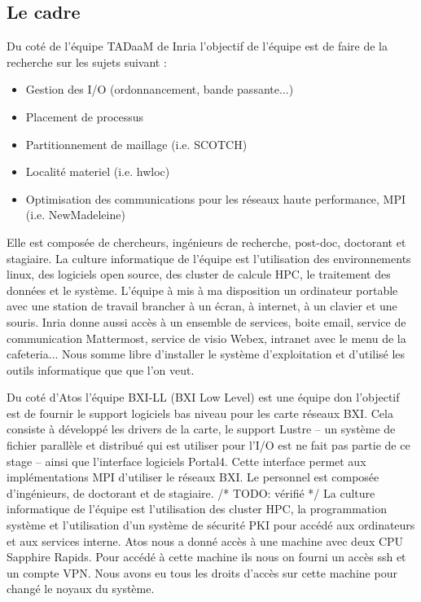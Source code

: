 \subsection{Le cadre}

Du coté de l'équipe TADaaM de Inria l'objectif de l'équipe est de faire de la recherche sur les sujets suivant :

\begin{itemize}
  \item Gestion des I/O (ordonnancement, bande passante...)
  \item Placement de processus
  \item Partitionnement de maillage (i.e. SCOTCH)
  \item Localité materiel (i.e. hwloc)
  \item Optimisation des communications pour les réseaux haute performance, MPI (i.e. NewMadeleine)
\end{itemize}

Elle est composée de chercheurs, ingénieurs de recherche, post-doc, doctorant et stagiaire.
La culture informatique de l'équipe est l'utilisation des environnements linux, des logiciels open source,
des cluster de calcule HPC, le traitement des données et le système.
L'équipe à mis à ma disposition un ordinateur portable avec une station de travail brancher à un écran, à internet, à un clavier et une souris.
Inria donne aussi accès à un ensemble de services, boite email, service de communication Mattermost, service de visio Webex, intranet avec le menu de la cafeteria...
Nous somme libre d'installer le système d'exploitation et d'utilisé les outils informatique que que l'on veut.

Du coté d'Atos l'équipe BXI-LL (BXI Low Level) est une équipe don l'objectif est de fournir le support logiciels bas niveau pour les carte réseaux BXI.
Cela consiste à développé les drivers de la carte, le support Lustre -- un système de fichier parallèle et distribué qui est utiliser pour l'I/O est ne fait pas partie de ce stage -- ainsi que l'interface logiciels Portal4.
Cette interface permet aux implémentations MPI d'utiliser le réseaux BXI.
Le personnel est composée d'ingénieurs, de doctorant et de stagiaire. /* TODO: vérifié */
La culture informatique de l'équipe est l'utilisation des cluster HPC, la programmation système et l'utilisation d'un système de sécurité PKI pour accédé aux ordinateurs et aux services interne.
Atos nous a donné accès à une machine avec deux CPU \intel{} Sapphire Rapids.
Pour accédé à cette machine ils nous on fourni un accès ssh et un compte VPN.
Nous avons eu tous les droits d'accès sur cette machine pour changé le noyaux du système.

